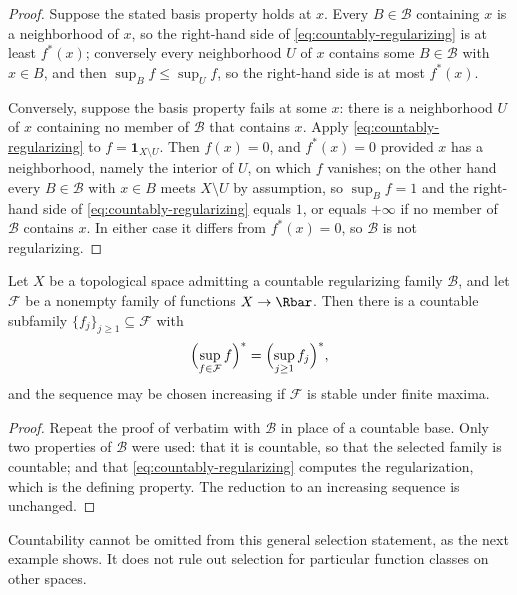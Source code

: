 \begin{proof}
Suppose the stated basis property holds at $x$.  Every $B\in\mathcal B$
containing $x$ is a neighborhood of $x$, so the right-hand side of
\eqref{eq:countably-regularizing} is at least $f^*(x)$; conversely every
neighborhood $U$ of $x$ contains some $B\in\mathcal B$ with $x\in B$, and then
$\sup_Bf\leq\sup_Uf$, so the right-hand side is at most $f^*(x)$.

Conversely, suppose the basis property fails at some $x$: there is a
neighborhood $U$ of $x$ containing no member of $\mathcal B$ that contains
$x$.  Apply \eqref{eq:countably-regularizing} to
$f=\mathbf 1_{X\setminus U}$.  Then $f(x)=0$, and $f^*(x)=0$ provided $x$ has
a neighborhood, namely the interior of $U$, on which $f$ vanishes; on the
other hand every $B\in\mathcal B$ with $x\in B$ meets $X\setminus U$ by
assumption, so $\sup_Bf=1$ and the right-hand side of
\eqref{eq:countably-regularizing} equals $1$, or equals $+\infty$ if no member
of $\mathcal B$ contains $x$.  In either case it differs from $f^*(x)=0$, so
$\mathcal B$ is not regularizing.
\end{proof}

\begin{proposition}
\label{prop:choquet-regularizing}
Let $X$ be a topological space admitting a countable regularizing family
$\mathcal B$, and let $\mathcal F$ be a nonempty family of functions
$X\to\Rbar$.  Then there is a countable subfamily
$\{f_j\}_{j\geq1}\subseteq\mathcal F$ with
\[
 \Bigl(\sup_{f\in\mathcal F}f\Bigr)^*=\Bigl(\sup_{j\geq1}f_j\Bigr)^* ,
\]
and the sequence may be chosen increasing if $\mathcal F$ is stable under
finite maxima.
\end{proposition}

\begin{proof}
Repeat the proof of  verbatim with $\mathcal B$ in
place of a countable base.  Only two properties of $\mathcal B$ were used:
that it is countable, so that the selected family is countable; and that
\eqref{eq:countably-regularizing} computes the regularization, which is the
defining property.  The reduction to an increasing sequence is unchanged.
\end{proof}

Countability cannot be omitted from this general selection statement, as
the next example shows.  It does not rule out selection for particular
function classes on other spaces.


